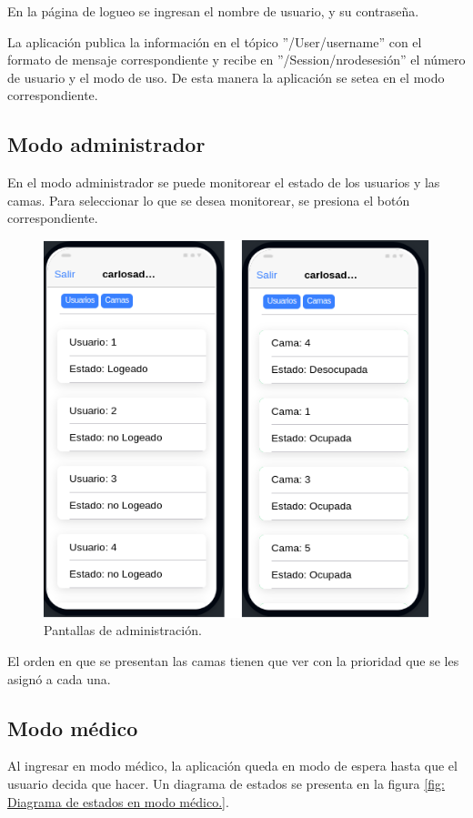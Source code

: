 En la página de logueo se ingresan el nombre de usuario, y su contraseña.

La aplicación publica la información en el tópico ''/User/username'' con el formato de mensaje correspondiente y recibe en ''/Session/nrodesesión'' el número de usuario y el modo de uso. De esta manera la aplicación se setea en el modo correspondiente.



\subsection{Modo administrador}
En el modo administrador se puede monitorear el estado de los usuarios y las camas. Para seleccionar lo que se desea monitorear, se presiona el botón correspondiente.

\begin{figure}[ht]
	\centering
	\includegraphics[scale=.70]{./Figures/app/administracion.png}
	\caption{ Pantallas de administración.}
	\label{fig: Pantallas de administración.}
\end{figure} 

El orden en que se presentan las camas tienen que ver con la prioridad que se les asignó a cada una.



\pagebreak
\subsection{Modo médico}
Al ingresar en modo médico, la aplicación queda en modo de espera hasta que el usuario decida que hacer. Un diagrama de estados se presenta en la figura \ref{fig: Diagrama de estados en modo médico.}. 

